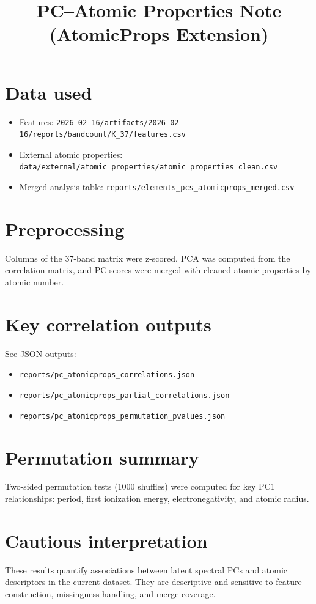 \documentclass[11pt]{article}
\title{PC--Atomic Properties Note (AtomicProps Extension)}
\date{}
\begin{document}
\maketitle

\section*{Data used}
\begin{itemize}
\item Features: \texttt{2026-02-16/artifacts/2026-02-16/reports/bandcount/K\_37/features.csv}
\item External atomic properties: \texttt{data/external/atomic\_properties/atomic\_properties\_clean.csv}
\item Merged analysis table: \texttt{reports/elements\_pcs\_atomicprops\_merged.csv}
\end{itemize}

\section*{Preprocessing}
Columns of the 37-band matrix were z-scored, PCA was computed from the correlation matrix, and PC scores were merged with cleaned atomic properties by atomic number.

\section*{Key correlation outputs}
See JSON outputs:
\begin{itemize}
\item \texttt{reports/pc\_atomicprops\_correlations.json}
\item \texttt{reports/pc\_atomicprops\_partial\_correlations.json}
\item \texttt{reports/pc\_atomicprops\_permutation\_pvalues.json}
\end{itemize}

\section*{Permutation summary}
Two-sided permutation tests (1000 shuffles) were computed for key PC1 relationships: period, first ionization energy, electronegativity, and atomic radius.

\section*{Cautious interpretation}
These results quantify associations between latent spectral PCs and atomic descriptors in the current dataset. They are descriptive and sensitive to feature construction, missingness handling, and merge coverage.
\end{document}
